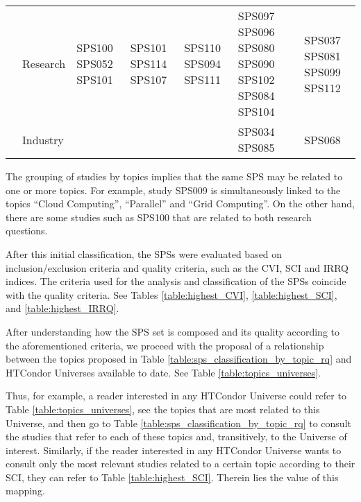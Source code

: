 \begin{table*}[htbp]
\begin{tabularx}{\textwidth}{p{0.8cm}p{2.5cm}>{\raggedright\arraybackslash}X>{\raggedright\arraybackslash}X>{\raggedright\arraybackslash}X>{\raggedright\arraybackslash}X>{\raggedright\arraybackslash}X}
		\addlinespace[0.3em]
		                                      & Research                & SPS100 SPS052 SPS101                                    & SPS101 SPS114 SPS107                                                                                                          & SPS110 SPS094 SPS111                                                                       & SPS097 SPS096 SPS080 SPS090 SPS102 SPS084 SPS104                                    & SPS037 SPS081 SPS099 SPS112        \\
		\addlinespace[0.3em]
		                                      & Industry                &                                                         &                                                                                                                               &                                                                                            & SPS034 SPS085                                                                       & SPS068                             \\
		\bottomrule
	\end{tabularx}
\end{table*}

The grouping of studies by topics implies that the same SPS may be related to one or more topics. For example, study SPS009 is simultaneously linked to the topics ``Cloud Computing'', ``Parallel'' and ``Grid Computing''. On the other hand, there are some studies such as SPS100 that are related to both research questions.

After this initial classification, the SPSs were evaluated based on inclusion/exclusion criteria and quality criteria, such as the CVI, SCI and IRRQ indices. The criteria used for the analysis and classification of the SPSs coincide with the quality criteria. See Tables \ref{table:highest_CVI}, \ref{table:highest_SCI}, and \ref{table:highest_IRRQ}.

After understanding how the SPS set is composed and its quality according to the aforementioned criteria, we proceed with the proposal of a relationship between the topics proposed in Table \ref{table:sps_classification_by_topic_rq} and HTCondor Universes available to date. See Table \ref{table:topics_universes}.

Thus, for example, a reader interested in any HTCondor Universe could refer to Table \ref{table:topics_universes}, see the topics that are most related to this Universe, and then go to Table \ref{table:sps_classification_by_topic_rq} to consult the studies that refer to each of these topics and, transitively, to the Universe of interest. Similarly, if the reader interested in any HTCondor Universe wants to consult only the most relevant studies related to a certain topic according to their SCI, they can refer to Table \ref{table:highest_SCI}. Therein lies the value of this mapping.


